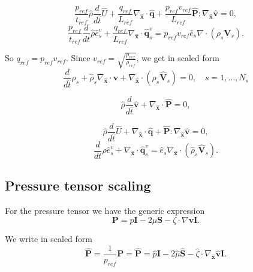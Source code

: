 \documentclass[a4paper,11pt,english]{article}
\begin{document}
\begin{equation}
     \frac{p_{ref}}{t_{ref}} \hat{\rho} \frac{d}{d\hat{t}}\hat{{U}} + \frac{q_{ref}}{L_{ref}} \nabla_{\hat{\mathbf{x}}} \cdot \hat{\mathbf{q}} + \frac{p_{ref}v_{ref}}{L_{ref}} \hat{\mathbf{P}} : \nabla_{\hat{\mathbf{x}}} \hat{\mathbf{v}} = 0,
\end{equation}
\begin{equation}
     \frac{p_{ref}}{t_{ref}} \frac{d}{dt} \hat{\rho} \hat{{e}}^v_s + \frac{q_{ref}}{L_{ref}} \nabla_{\hat{\mathbf{x}}} \cdot \hat{\mathbf{q}}^v_s = p_{ref}v_{ref}\hat{e}_s \nabla \cdot (\rho_s \mathbf{V}_s).
\end{equation}

So $q_{ref} = p_{ref}v_{ref}$. Since $v_{ref} = \sqrt{\frac{p_{ref}}{\rho_{ref}}}$, we get in scaled form
\begin{equation}
     \frac{d}{d\hat{t}}\hat{\rho}_s +  \hat{\rho}_s \nabla_{\hat{\mathbf{x}}} \cdot \hat{\mathbf{v}} + \nabla_{\hat{\mathbf{x}}} \cdot (\rho_s \hat{\mathbf{V}}_s) = 0,\quad s=1,\ldots,N_s
 \end{equation}
 
 \begin{equation}
     \hat{\rho} \frac{d}{d\hat{t}}\hat{\mathbf{v}} + \nabla_{\hat{\mathbf{x}}} \cdot \hat{\mathbf{P}} = 0,
 \end{equation}
 
 \begin{equation}
     \hat{\rho} \frac{d}{d\hat{t}}\hat{{U}} + \nabla_{\hat{\mathbf{x}}} \cdot \hat{\mathbf{q}} +  \hat{\mathbf{P}} : \nabla_{\hat{\mathbf{x}}} \hat{\mathbf{v}} = 0,
 \end{equation}
 \begin{equation}
      \frac{d}{dt} \hat{\rho} \hat{{e}}^v_s + \nabla_{\hat{\mathbf{x}}} \cdot \hat{\mathbf{q}}^v_s = \hat{e}_s \nabla_{\hat{\mathbf{x}}} \cdot (\hat{\rho}_s \hat{\mathbf{V}}_s).
 \end{equation}


\subsection{Pressure tensor scaling}
For the pressure tensor we have the generic expression
\begin{equation}
     \mathbf{P} = p \mathbf{I} - 2\mu \mathbf{S} - \zeta \cdot \nabla \mathbf{v} \mathbf{I}.
\end{equation}

We write in scaled form
\begin{equation}
     \hat{\mathbf{P}} = \frac{1}{p_{ref}}{\mathbf{P}} = \hat{\mathbf{P}} = \hat{p} \mathbf{I} - 2\hat{\mu} \hat{\mathbf{S}} - \hat{\zeta} \cdot \nabla_{\hat{\mathbf{x}}} \hat{\mathbf{v}} \mathbf{I}.
\end{equation}
\end{document}

